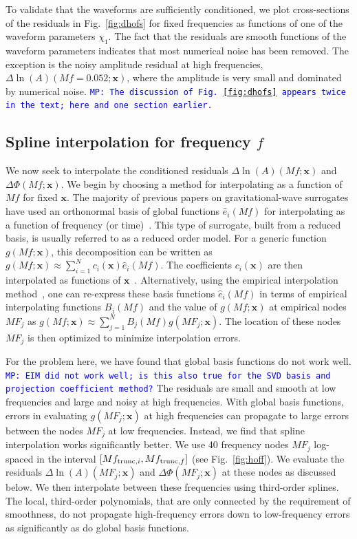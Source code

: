 \documentclass[prd,aps,letter,twocolumn,floatfix,notitlepage,nofootinbib]{revtex4-1}
\def\bx{\mathbf{x}}
\newcommand{\MP}[1]{{\textcolor{blue}{\texttt{MP: #1}} }}
\begin{document}
To validate that the waveforms are sufficiently conditioned, we plot cross-sections of the residuals in Fig.~\ref{fig:dhofs} for fixed frequencies as functions of one of the waveform parameters $\chi_1$. The fact that the residuals are smooth functions of the waveform parameters indicates that most numerical noise has been removed. The exception is the noisy amplitude residual at high frequencies, $\Delta\ln(A)(Mf=0.052; \bx)$, where the amplitude is very small and dominated by numerical noise. 
\MP{The discussion of Fig.~\ref{fig:dhofs} appears twice in the text; here and one section earlier.}

\subsection{Spline interpolation for frequency $f$}

We now seek to interpolate the conditioned residuals $\Delta\ln(A)(Mf; \bx)$ and $\Delta\Phi(Mf; \bx)$. We begin by choosing a method for interpolating as a function of $Mf$ for fixed $\bx$. The majority of previous papers on gravitational-wave surrogates have used an orthonormal basis of global functions $\hat e_i(Mf)$ for interpolating as a function of frequency (or time)~\cite{Puerrer2014, Puerrer2015, FieldGalleyHesthaven2014, LackeyBernuzziGalley2017, BlackmanFieldGalley2015, BlackmanFieldScheel2017a, BlackmanFieldScheel2017b}. This type of surrogate, built from a reduced basis, is usually referred to as a reduced order model. For a generic function $g(Mf; \bx)$, this decomposition can be written as $g(Mf; \bx) \approx \sum_{i=1}^N c_i(\bx) \hat e_i(Mf)$. The coefficients $c_i(\bx)$ are then interpolated as functions of $\bx$~\cite{Puerrer2014, Puerrer2015}. Alternatively, using the empirical interpolation method~\cite{Barrault2004, Chaturantabut2010, FieldGalleyHesthaven2014}, one can re-express these basis functions $\hat e_i(Mf)$ in terms of empirical interpolating functions $B_j(Mf)$ and the value of $g(Mf; \bx)$ at empirical nodes $MF_j$ as $g(Mf; \bx) \approx \sum_{j=1}^N B_j(Mf) g(MF_j; \bx)$. The location of these nodes $MF_j$ is then optimized to minimize interpolation errors.

For the problem here, we have found that global basis functions do not work well. \MP{EIM did not work well; is this also true for the SVD basis and projection coefficient method?} The residuals are small and smooth at low frequencies and large and noisy at high frequencies. With global basis functions, errors in evaluating $g(MF_j;\bx)$ at high frequencies can propagate to large errors between the nodes $MF_j$ at low frequencies. Instead, we find that spline interpolation works significantly better. We use 40 frequency nodes $MF_j$ log-spaced in the interval $[Mf_{{\rm trunc}, i}, Mf_{{\rm trunc}, f}]$ (see Fig.~\ref{fig:hoff}). We evaluate the residuals $\Delta\ln(A)(MF_j; \bx)$ and $\Delta\Phi(MF_j; \bx)$ at these nodes as discussed below. We then interpolate between these frequencies using third-order splines. The local, third-order polynomials, that are only connected by the requirement of smoothness, do not propagate high-frequency errors down to low-frequency errors as significantly as do global basis functions.
\end{document}
